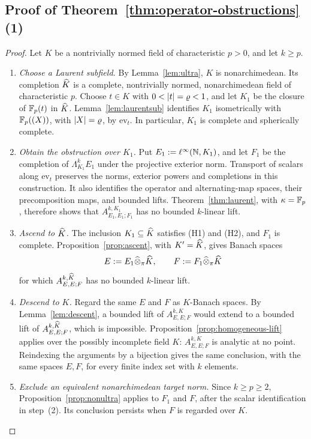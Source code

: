 \subsection{Proof of Theorem~\ref{thm:operator-obstructions}(1)}
\begin{proof}
Let $K$ be a nontrivially normed field of characteristic $p>0$, and let $k\ge p$.
\begin{enumerate}
\item \emph{Choose a Laurent subfield.} By Lemma~\ref{lem:ultra}, $K$ is nonarchimedean. Its completion $\widehat K$ is
a complete, nontrivially normed, nonarchimedean field of characteristic $p$. Choose $t\in K$ with
$0<\lvert t\rvert=\varrho<1$, and let $K_1$ be the closure of $\mathbb F_p(t)$ in $\widehat K$. Lemma~\ref{lem:laurentsub} identifies $K_1$
isometrically with $\mathbb F_p((X))$, with $\lvert X\rvert=\varrho$, by $\mathrm{ev}_t$. In particular, $K_1$ is complete and
spherically complete.
\item \emph{Obtain the obstruction over $K_1$.} Put $E_1:=\ell^\infty(\mathbb N,K_1)$, and let $F_1$ be the completion of
$\Lambda^k_{K_1}E_1$ under the projective exterior norm. Transport of scalars along $\mathrm{ev}_t$ preserves
the norms, exterior powers and completions in this construction. It also identifies the operator and
alternating-map spaces, their precomposition maps, and bounded lifts. Theorem~\ref{thm:laurent}, with
$\kappa=\mathbb F_p$, therefore shows that $A^{k,K_1}_{E_1,E_1;F_1}$ has no bounded $k$\nobreakdash-linear lift.
\item \emph{Ascend to $\widehat K$.} The inclusion $K_1\subseteq\widehat K$ satisfies (H1) and (H2), and $F_1$ is complete.
Proposition~\ref{prop:ascent}, with $K'=\widehat K$, gives Banach spaces
\[
E:=E_1\widehat\otimes_\pi\widehat K,\qquad F:=F_1\widehat\otimes_\pi\widehat K
\]
for which $A^{k,\widehat K}_{E,E;F}$ has no bounded $k$\nobreakdash-linear lift.
\item \emph{Descend to $K$.} Regard the same $E$ and $F$ as $K$\nobreakdash-Banach spaces. By
Lemma~\ref{lem:descent}, a bounded lift of $A^{k,K}_{E,E;F}$ would extend to a bounded lift of
$A^{k,\widehat K}_{E,E;F}$, which is impossible. Proposition~\ref{prop:homogeneous-lift} applies over the possibly incomplete
field $K$: $A^{k,K}_{E,E;F}$ is analytic at no point. Reindexing the arguments by a bijection gives the same conclusion, with the same spaces $E,F$, for every finite index set with $k$ elements.
\item \emph{Exclude an equivalent nonarchimedean target norm.} Since $k\ge p\ge2$, Proposition~\ref{prop:nonultra}
applies to $F_1$ and $F$, after the scalar identification in step~(2). Its conclusion persists when $F$ is
regarded over $K$.\qedhere
\end{enumerate}
\end{proof}


